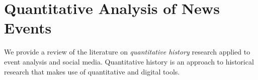 







\section{Quantitative Analysis of News Events}

We provide a review of the literature on {\em quantitative history} research
applied to event analysis and social media. 
%
Quantitative history is an approach to historical research that makes use of
quantitative and digital tools. 


